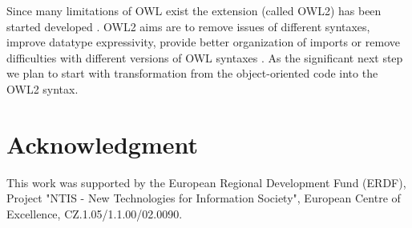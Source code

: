 \documentclass[conference]{IEEEtran}
\begin{document}
Since many limitations of OWL exist the extension (called OWL2) has been started developed \cite{owl-web-ontology-language}. OWL2 aims are to remove issues of different syntaxes, improve datatype expressivity, provide better organization of imports or remove difficulties with different versions of OWL syntaxes \cite{OWL2-Next-Step}. As the significant next step we plan to start with transformation from the object-oriented code into the OWL2 syntax.





\section*{Acknowledgment}


This work was supported by the European Regional Development Fund (ERDF), Project "NTIS - New Technologies for Information Society", European Centre of Excellence, CZ.1.05/1.1.00/02.0090.






%
%
%
{}




\end{document}
